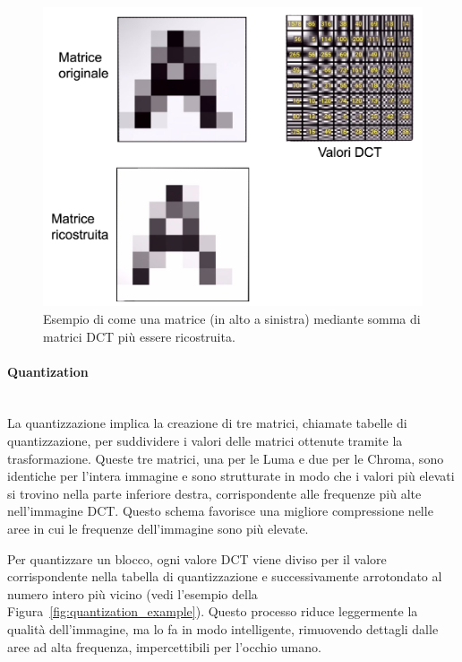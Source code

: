 \documentclass[a4paper,12pt, oneside]{article}
\begin{document}
\begin{figure}[h]
    \centering
    \includegraphics[width=1\textwidth]{images/DCT-example.png}
    \caption{Esempio di come una matrice (in alto a sinistra) mediante somma di matrici DCT
    più essere ricostruita.}
    \label{fig:DCT_example}
\end{figure}

\paragraph{Quantization}\hphantom{A}\\
La quantizzazione implica la creazione di tre matrici, chiamate tabelle di quantizzazione, per
suddividere i valori delle matrici ottenute tramite la trasformazione. Queste tre matrici, una
per le Luma e due per le Chroma, sono identiche per l'intera immagine e sono strutturate in
modo che i valori più elevati si trovino nella parte inferiore destra, corrispondente alle
frequenze più alte nell'immagine DCT. Questo schema favorisce una migliore compressione nelle
aree in cui le frequenze dell'immagine sono più elevate.

Per quantizzare un blocco, ogni valore DCT viene diviso per il valore corrispondente nella
tabella di quantizzazione e successivamente arrotondato al numero intero più vicino (vedi
l'esempio della Figura~\ref{fig:quantization_example}). Questo processo riduce leggermente la
qualità dell'immagine, ma lo fa in modo intelligente, rimuovendo dettagli dalle aree ad alta
frequenza, impercettibili per l'occhio umano.
\end{document}
